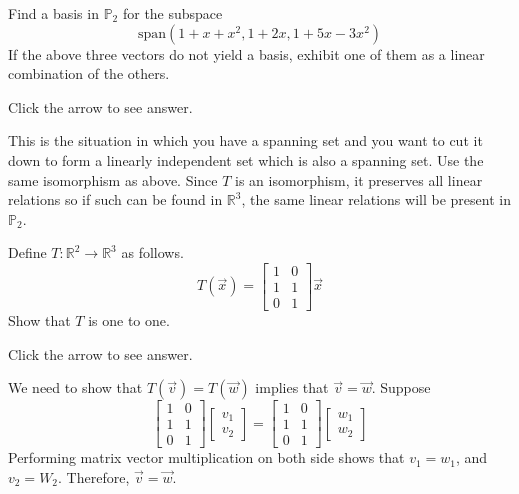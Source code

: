 \documentclass{ximera}
\begin{document}
\begin{problem}\label{prb:10.29} Find a basis in $\mathbb{P}_{2}$ for the subspace
\begin{equation*}
\mbox{span}\left( 1+x+x^{2},1+2x,1+5x-3x^{2}\right)
\end{equation*}
If the above three vectors do not yield a basis, exhibit one of them as a
linear combination of the others. 

Click the arrow to see answer.
\begin{expandable}
This is the situation in
which you have a spanning set and you want to cut it down to form a linearly
independent set which is also a spanning set. Use the same isomorphism as
above. Since $T$ is an isomorphism, it preserves all linear relations so if
such can be found in $\mathbb{R}^{3}$, the same linear relations will be
present in $\mathbb{P}_{2}$.
\end{expandable}
\end{problem}

\begin{problem}\label{prb:10.83} Define $T:\mathbb{R}^{2}\rightarrow \mathbb{R}^{3}$ as follows.
\begin{equation*}
T(\vec{x})=\left[
\begin{array}{cc}
1 & 0 \\
1 & 1 \\
0 & 1
\end{array}
\right] \vec{x}
\end{equation*}
Show that $T$ is one to one. 

Click the arrow to see answer.

\begin{expandable}
    We need to show that $T(\vec{v})=T(\vec{w})$ implies that $\vec{v}=\vec{w}$. Suppose $$\begin{bmatrix}1 & 0\\1 & 1\\0& 1\end{bmatrix}\begin{bmatrix}v_1\\v_2\end{bmatrix}=\begin{bmatrix}1 & 0\\1 & 1\\0& 1\end{bmatrix}\begin{bmatrix}w_1\\w_2\end{bmatrix}$$
    Performing matrix vector multiplication on both side shows that $v_1=w_1$, and $v_2=W_2$.  Therefore, $\vec{v}=\vec{w}$. 
\end{expandable}

\end{problem}
\end{document}
